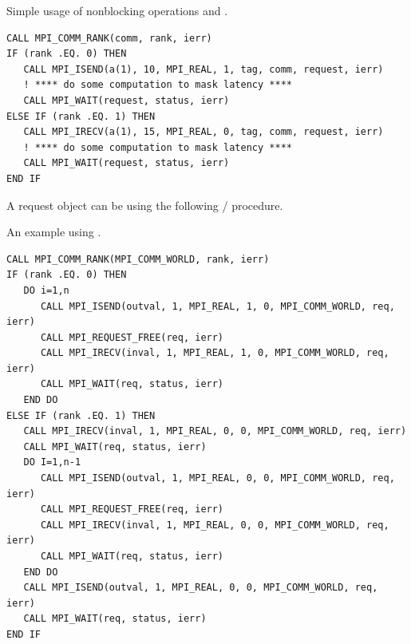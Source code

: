 \begin{example}
\begin{example}
\label{pt2pt-exJ}
%
%
%
%
Simple usage of nonblocking operations and .
\begin{lstlisting}[language={[MPI]Fortran}]
CALL MPI_COMM_RANK(comm, rank, ierr)
IF (rank .EQ. 0) THEN
   CALL MPI_ISEND(a(1), 10, MPI_REAL, 1, tag, comm, request, ierr)
   ! **** do some computation to mask latency ****
   CALL MPI_WAIT(request, status, ierr)
ELSE IF (rank .EQ. 1) THEN
   CALL MPI_IRECV(a(1), 15, MPI_REAL, 0, tag, comm, request, ierr)
   ! **** do some computation to mask latency ****
   CALL MPI_WAIT(request, status, ierr)
END IF
\end{lstlisting}
\end{example}

A request object can be  using the following \MPI/ procedure.

\begin{example}
\label{pt2pt-exK}
%
%
%
%
%
An example using .

\begin{lstlisting}[language={[MPI]Fortran},basicstyle=\lstsmall]
CALL MPI_COMM_RANK(MPI_COMM_WORLD, rank, ierr)
IF (rank .EQ. 0) THEN
   DO i=1,n
      CALL MPI_ISEND(outval, 1, MPI_REAL, 1, 0, MPI_COMM_WORLD, req, ierr)
      CALL MPI_REQUEST_FREE(req, ierr)
      CALL MPI_IRECV(inval, 1, MPI_REAL, 1, 0, MPI_COMM_WORLD, req, ierr)
      CALL MPI_WAIT(req, status, ierr)
   END DO
ELSE IF (rank .EQ. 1) THEN
   CALL MPI_IRECV(inval, 1, MPI_REAL, 0, 0, MPI_COMM_WORLD, req, ierr)
   CALL MPI_WAIT(req, status, ierr)
   DO I=1,n-1
      CALL MPI_ISEND(outval, 1, MPI_REAL, 0, 0, MPI_COMM_WORLD, req, ierr)
      CALL MPI_REQUEST_FREE(req, ierr)
      CALL MPI_IRECV(inval, 1, MPI_REAL, 0, 0, MPI_COMM_WORLD, req, ierr)
      CALL MPI_WAIT(req, status, ierr)
   END DO
   CALL MPI_ISEND(outval, 1, MPI_REAL, 0, 0, MPI_COMM_WORLD, req, ierr)
   CALL MPI_WAIT(req, status, ierr)
END IF
\end{lstlisting}
\end{example}


\end{example}
